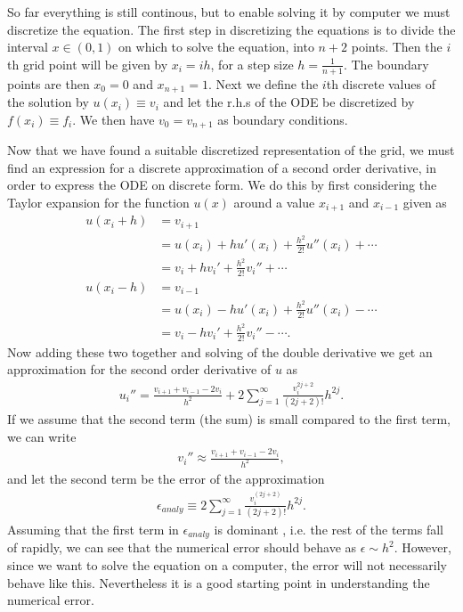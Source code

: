 \documentclass[twocolumn]{aastex62}
\begin{document}
So far everything is still continous, but to enable solving it by computer we must discretize the equation. The first step in discretizing the equations is to divide the interval $x\in(0,1)$ on which to solve the equation, into $n+2$ points. Then the $i$th grid point will be given by $x_i = ih$, for a step size $h = \frac{1}{n + 1}$. The boundary points are then $x_0 = 0$ and $x_{n+1} = 1$. Next we define the $i$th discrete values of the solution by $u(x_i) \equiv v_i$ and let the r.h.s of the ODE be discretized by $f(x_i) \equiv f_i$. We then have $v_0 = v_{n+1}$ as boundary conditions.

Now that we have found a suitable discretized representation of the grid, we must find an expression for a discrete approximation of a second order derivative, in order to express the ODE on discrete form. We do this by first considering the Taylor expansion for the function $u(x)$ around a value $x_{i+1} $ and $x_{i-1}$ given as
\begin{align*}
	u(x_i + h) &= v_{i+1} \\
	&= u(x_i) + hu'(x_i) + \frac{h^2}{2!}u''(x_i) +\cdots\\
	&= v_i + hv_i' + \frac{h^2}{2!}v_i'' + \cdots\\
	u(x_i - h) &= v_{i-1} \\
	& = u(x_i) - hu'(x_i) + \frac{h^2}{2!}u''(x_i) -\cdots\\
	&= v_i - hv_i' + \frac{h^2}{2!}v_i'' - \cdots.
\end{align*} 
Now adding these two together and solving of the double derivative we get an approximation for the second order derivative of $u$ as 
\begin{align}
	u_i'' = \frac{v_{i+1} + v_{i-1} - 2v_i}{h^2} + 2\sum^\infty_{j=1} \frac{v_i^{2j+2}}{(2j + 2)!}h^{2j}.
\end{align}
If we assume that the second term (the sum) is small compared to the first term, we can write 
\begin{align}
	v_i''\approx \frac{v_{i+1} + v_{i-1} - 2v_i}{h^2},
\end{align}
and let the second term be the error of the approximation
\begin{align}
	\epsilon_{analy} \equiv 2\sum^\infty_{j=1} \frac{v_i^{(2j+2)}}{(2j + 2)!}h^{2j}.
	\label{eq:analy_error}
\end{align} Assuming that the first term in $\epsilon_{analy}$ is dominant , i.e. the rest of the terms fall of rapidly, we can see that the numerical error should behave as $\epsilon\sim h^2$. However, since we want to solve the equation on a computer, the error will not necessarily behave like this. Nevertheless it is a good starting point in understanding the numerical error. 
\end{document}
